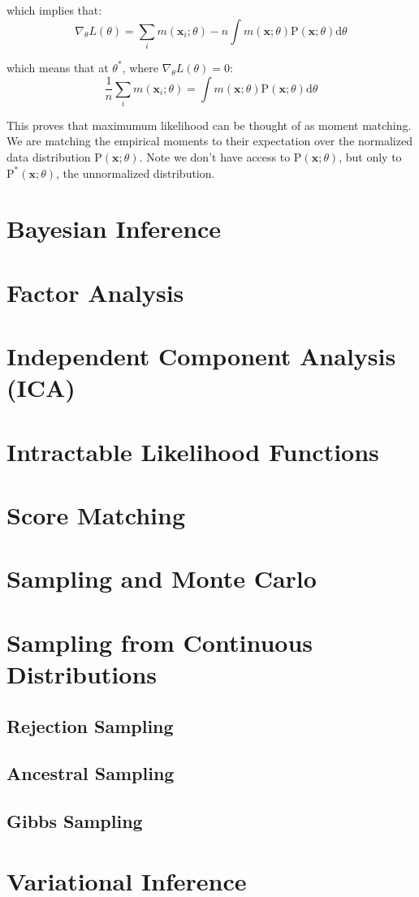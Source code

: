 \documentclass{article}
\newcommand{\prob}{\text{P}}
\renewcommand{\vec}[1]{\mathbf{#1}}
\newcommand{\bx}{\vec{x}}
\begin{document}
which implies that:
\begin{equation*}
    \nabla_\theta L(\theta) = \sum_i m(\bx_i; \theta) - n \int m(\bx; \theta) \prob(\bx; \theta) \text{d} \theta
\end{equation*}

which means that at $\theta^*$, where $\nabla_\theta L(\theta) = 0$:
\begin{equation*}
    \frac{1}{n} \sum_i m(\bx_i; \theta) = \int m(\bx; \theta) \prob(\bx; \theta) \text{d} \theta
\end{equation*}

This proves that maximumum likelihood can be thought of as moment matching. We are matching the empirical moments to their expectation over the normalized data distribution $\prob(\bx; \theta)$. Note we don't have access to $\prob(\bx; \theta)$, but only to $\prob^*(\bx; \theta)$, the unnormalized distribution.

\section{Bayesian Inference}
\section{Factor Analysis}
\section{Independent Component Analysis (ICA)}

\section{Intractable Likelihood Functions}
\section{Score Matching}
\section{Sampling and Monte Carlo}

\section{Sampling from Continuous Distributions}
\subsection{Rejection Sampling}
\subsection{Ancestral Sampling}
\subsection{Gibbs Sampling}

\section{Variational Inference}


\end{document}
